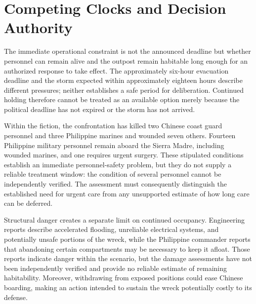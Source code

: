 \documentclass[11pt]{article}
\begin{document}
\section{Competing Clocks and Decision Authority}
The immediate operational constraint is not the announced deadline but whether personnel can remain alive and the outpost remain habitable long enough for an authorized response to take effect. The approximately six-hour evacuation deadline and the storm expected within approximately eighteen hours describe different pressures; neither establishes a safe period for deliberation. Continued holding therefore cannot be treated as an available option merely because the political deadline has not expired or the storm has not arrived.

Within the fiction, the confrontation has killed two Chinese coast guard personnel and three Philippine marines and wounded seven others. Fourteen Philippine military personnel remain aboard the Sierra Madre, including wounded marines, and one requires urgent surgery. These stipulated conditions establish an immediate personnel-safety problem, but they do not supply a reliable treatment window: the condition of several personnel cannot be independently verified. The assessment must consequently distinguish the established need for urgent care from any unsupported estimate of how long care can be deferred.

\begingroup\setlength{\fboxsep}{9pt}
\noindent{}\endgroup\par\medskip
Structural danger creates a separate limit on continued occupancy. Engineering reports describe accelerated flooding, unreliable electrical systems, and potentially unsafe portions of the wreck, while the Philippine commander reports that abandoning certain compartments may be necessary to keep it afloat. Those reports indicate danger within the scenario, but the damage assessments have not been independently verified and provide no reliable estimate of remaining habitability. Moreover, withdrawing from exposed positions could ease Chinese boarding, making an action intended to sustain the wreck potentially costly to its defense.
\end{document}
